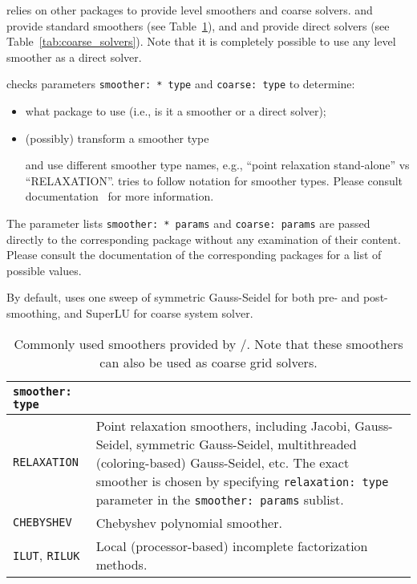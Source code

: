 \muelu{} relies on other \trilinos{} packages to provide level smoothers and
coarse solvers. \ifpack{} and \ifpacktwo{} provide standard smoothers (see
Table~\ref{tab:smoothers}), and \amesos{} and \amesostwo{} provide direct
solvers (see Table~\ref{tab:coarse_solvers}). Note that it is completely possible to use
any level smoother as a direct solver.

\muelu{} checks parameters \verb|smoother: * type| and \verb|coarse: type| to
determine:
\begin{itemize}
  \item what package to use (i.e., is it a smoother or a direct solver);
  \item (possibly) transform a smoother type

     \ifpack{} and \ifpacktwo{} use different smoother type names,
    e.g., ``point relaxation stand-alone'' vs ``RELAXATION''.  \muelu{} tries to follow
    \ifpacktwo{} notation for smoother types. Please consult \ifpacktwo{}
    documentation~\cite{Ifpack2} for more information.
\end{itemize}
The parameter lists \verb|smoother: * params| and \verb|coarse: params| are
passed directly to the corresponding package without any examination of their
content. Please consult the documentation of the corresponding packages for a list of
possible values.

By default, \muelu{} uses one sweep of symmetric Gauss-Seidel for both pre- and
post-smoothing, and SuperLU for coarse system solver.

\begin{table}[tbh]
  \begin{center}
    \begin{tabular}{p{4.0cm} p{10cm}}
      \toprule
      \texttt{smoother: type}           & \\
      \midrule
      \verb|RELAXATION|                 & Point relaxation smoothers, including
                                          Jacobi, Gauss-Seidel, symmetric Gauss-Seidel,
                                          multithreaded (coloring-based) Gauss-Seidel, etc. The exact
                                          smoother is chosen by specifying \texttt{relaxation: type} parameter in
                                          the \texttt{smoother: params} sublist. \\
      \verb|CHEBYSHEV|                  & Chebyshev polynomial smoother. \\
      \verb|ILUT|, \verb|RILUK|         & Local (processor-based) incomplete factorization methods. \\
      \bottomrule
    \end{tabular}
    \caption{Commonly used smoothers provided by \ifpack{}/\ifpacktwo{}. Note
    that these smoothers can also be used as coarse grid solvers.}
\label{tab:smoothers}
  \end{center}
\end{table}

